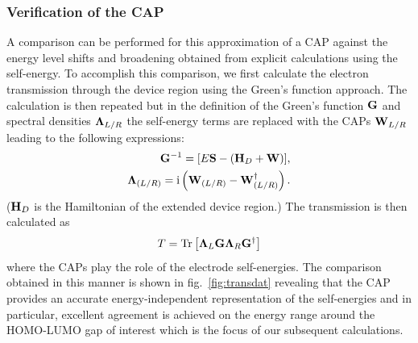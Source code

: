 \subsubsection{Verification of the \ac{CAP}}
A comparison can be performed for this approximation of a \ac{CAP} 
against the energy level shifts and broadening
obtained from explicit calculations using the self-energy. To accomplish
this comparison, we first calculate the electron transmission through
the device region using the Green's function
approach. The calculation is then repeated but in the definition of the
Green's function ${\bf G}$ and spectral densities ${\bf \Lambda}_{L/R}$ the
self-energy terms are replaced with the \acp{CAP} $\mathbf{W}_{L/R}$ leading
to the following expressions:
\numparts
\begin{eqnarray}
	  \mathbf{G}^{-1} = [E\mathbf{S} - (\mathbf{H}_D + \mathbf{W})], \\
	  \mathbf{\Lambda}_{(L/R)} = \mathrm{i} \left( \mathbf{W}_{(L/R)} - \mathbf{W}^\dagger_{(L/R)}
    \right).
  \label{eq:glambdadef}
\end{eqnarray}
\endnumparts
($\mathbf{H}_D$ is the Hamiltonian of the extended device region.) The
transmission is then calculated as
\begin{equation}
  T = \mathop{\mathrm{Tr}}\nolimits \left[ \mathbf{\Lambda}_L \mathbf{G} \mathbf{\Lambda}_R \mathbf{G}^\dagger \right]
  \label{eq:transmfromG}
\end{equation}
where the \acp{CAP} play the role of the electrode self-energies.
The comparison obtained in this manner is shown in fig.~\ref{fig:transdat}
revealing that the \ac{CAP} provides an accurate energy-independent
representation of the self-energies and in particular, excellent agreement
is achieved on the energy range around the \ac{HOMO}-\ac{LUMO} gap of
interest which is the focus of our subsequent calculations.


